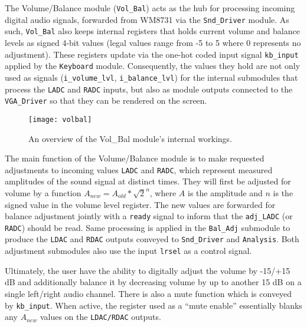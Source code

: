The Volume/Balance module (\verb=Vol_Bal=) acts as the hub for processing incoming digital audio signals, forwarded from WM8731 via the \verb=Snd_Driver= module. As such, \verb=Vol_Bal= also keeps internal registers that holds current volume and balance levels as signed 4-bit values (legal values range from -5 to 5 where 0 represents no adjustment). These registers update via the one-hot coded input signal \verb=kb_input= applied by the \verb=Keyboard= module. Consequently, the values they hold are not only used as signals (\verb=i_volume_lvl=, \verb=i_balance_lvl=) for the internal submodules that process the \verb=LADC= and \verb=RADC= inputs, but also as module outputs connected to the \verb=VGA_Driver= so that they can be rendered on the screen.

\begin{figure}[h]
  \centering
  \texttt{[image: volbal]}
  \caption{An overview of the Vol\_Bal module's internal workings.}
  \label{fig:vol_bal}
\end{figure}

The main function of the Volume/Balance module is to make requested adjustments to incoming values \verb=LADC= and \verb=RADC=, which represent measured amplitudes of the sound signal at distinct times. They will first be adjusted for volume by a function $A_{new} = A_{old} * \sqrt{2}^n$, where $A$ is the amplitude and $n$ is the signed value in the volume level register. The new values are forwarded for balance adjustment jointly with a \verb=ready= signal to inform that the \verb=adj_LADC= (or \verb=RADC=) should be read. Same processing is applied in the \verb=Bal_Adj= submodule to produce the \verb=LDAC= and \verb=RDAC= outputs conveyed to \verb=Snd_Driver= and \verb=Analysis=. Both adjustment submodules also use the input \verb=lrsel= as a control signal.

Ultimately, the user have the ability to digitally adjust the volume by -15/+15 dB and additionally balance it by decreasing volume by up to another 15 dB on a single left/right audio channel. There is also a mute function which is conveyed by \verb=kb_input=. When active, the register used as a ``mute enable'' essentially blanks any $A_{new}$ values on the \verb=LDAC/RDAC= outputs.


